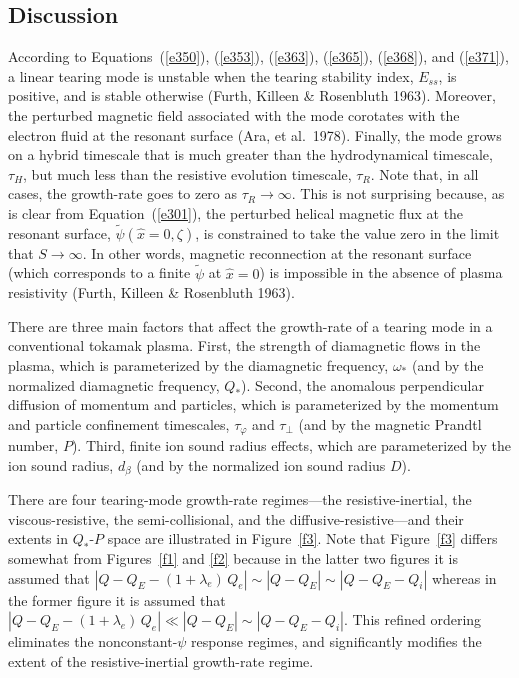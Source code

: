 \documentclass[notitlepage,12pt]{article}
\begin{document}
\subsection{Discussion}
According to Equations~(\ref{e350}), (\ref{e353}), (\ref{e363}), (\ref{e365}), (\ref{e368}), and (\ref{e371}), a linear tearing mode is unstable when the tearing stability index, $E_{ss}$, is positive, and is stable otherwise (Furth, Killeen \& Rosenbluth 1963).
Moreover, the perturbed magnetic field associated with the mode corotates with the electron fluid at the resonant surface (Ara, et al.\ 1978). Finally,
the mode grows on a hybrid timescale that is much greater than the hydrodynamical timescale, $\tau_H$,
but much less than the resistive evolution timescale, $\tau_R$. Note that, in all cases, the growth-rate goes to zero as
$\tau_R\rightarrow \infty$. This is not surprising because, as is clear from Equation~(\ref{e301}), the perturbed
helical magnetic flux at the resonant surface,  $\tilde{\psi}(\hat{x}=0,\zeta)$, is constrained to take the value zero
in the limit that $S\rightarrow\infty$. In other words, magnetic reconnection at the resonant surface (which corresponds to a finite
$\tilde{\psi}$ at $\hat{x}=0$) is impossible in the absence of plasma resistivity (Furth, Killeen \& Rosenbluth 1963). 

There are three main factors that
affect the growth-rate of a tearing mode in a conventional tokamak plasma. First, the strength of diamagnetic flows in the plasma, which is parameterized by the
diamagnetic frequency, $\omega_\ast$ (and by the normalized diamagnetic frequency, $Q_\ast$). Second, the  anomalous perpendicular diffusion of momentum and particles, which is parameterized by the momentum and particle confinement
timescales, $\tau_\varphi$ and $\tau_\perp$ (and by the magnetic Prandtl number, $P$). Third, finite ion sound radius effects,  which are parameterized by the ion sound radius, $d_\beta$ (and by the normalized ion 
sound radius $D$).

 There are four tearing-mode growth-rate regimes---the resistive-inertial, the viscous-resistive, the semi-collisional, and the diffusive-resistive---and their extents in $Q_\ast$-$P$ space are illustrated in Figure~\ref{f3}.
Note that Figure~\ref{f3} differs somewhat from Figures~\ref{f1} and \ref{f2} because in the latter two
figures it is assumed that $|Q-Q_E-(1+\lambda_e)\,Q_e|\sim |Q-Q_E|\sim |Q-Q_E-Q_i|$ whereas
in the former figure it is assumed that $|Q-Q_E-(1+\lambda_e)\,Q_e|\ll |Q-Q_E|\sim |Q-Q_E-Q_i|$.
This refined ordering eliminates the nonconstant-$\psi$ response regimes, and significantly modifies the
extent of the resistive-inertial growth-rate regime. 
\end{document}
